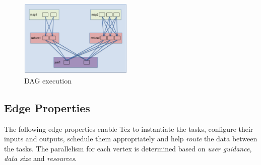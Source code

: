 \documentclass[twocolumn]{article}
\begin{document}
\begin{figure}[htb]
        \centering
        \includegraphics[width=0.48\textwidth]{tez21}
        \caption{DAG execution}
        \label{fig05}
\end{figure}


\subsection{Edge Properties}

The following edge properties enable Tez to instantiate the tasks,
configure their inputs and outputs, schedule them appropriately and help
\emph{route} the data between the tasks. The parallelism for each vertex
is determined based on \emph{user guidance}, \emph{data size} and
\emph{resources}.
\end{document}
